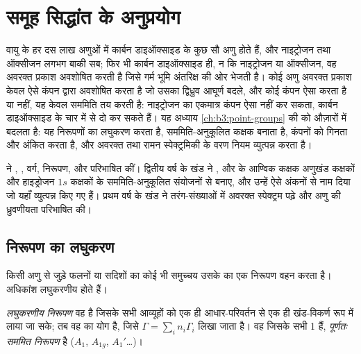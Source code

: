 \chapter{समूह सिद्धांत के अनुप्रयोग}\label{ch:b3:group-theory-applied}

वायु के हर दस लाख अणुओं में कार्बन डाइऑक्साइड के कुछ सौ अणु होते हैं, और
नाइट्रोजन तथा ऑक्सीजन लगभग बाकी सब; फिर भी कार्बन डाइऑक्साइड ही, न कि
नाइट्रोजन या ऑक्सीजन, वह अवरक्त प्रकाश अवशोषित करती है जिसे गर्म भूमि
अंतरिक्ष की ओर भेजती है। कोई अणु अवरक्त प्रकाश केवल ऐसे कंपन द्वारा अवशोषित करता है जो
उसका द्विध्रुव आघूर्ण बदले, और कोई कंपन ऐसा करता है या नहीं, यह केवल
सममिति तय करती है: नाइट्रोजन का एकमात्र कंपन ऐसा नहीं कर सकता, कार्बन डाइऑक्साइड के
चार में से दो कर सकते हैं। यह अध्याय
\cref{ch:b3:point-groups} की  को औज़ारों में बदलता है: यह निरूपणों का
लघुकरण करता है, सममिति-अनुकूलित कक्षक बनाता है, कंपनों को गिनता और अंकित करता है,
और अवरक्त तथा रामन स्पेक्ट्रमिकी के वरण नियम व्युत्पन्न करता है।

\begin{recall}
 ने , ,
वर्ग, निरूपण,  और  परिभाषित कीं। द्वितीय वर्ष के
खंड ने ,  और  के आण्विक कक्षक
अणुखंड कक्षकों और हाइड्रोजन $1s$
कक्षकों के सममिति-अनुकूलित संयोजनों से बनाए, और उन्हें ऐसे अंकनों से नाम दिया जो यहाँ व्युत्पन्न
किए गए हैं। प्रथम वर्ष के खंड ने तरंग-संख्याओं में अवरक्त स्पेक्ट्रम पढ़े और अणु की
ध्रुवणीयता परिभाषित की।
\end{recall}

\section{निरूपण का लघुकरण}

किसी अणु से जुड़े फलनों या सदिशों का कोई भी समुच्चय उसके  का एक
निरूपण वहन करता है। अधिकांश लघुकरणीय होते हैं।

\begin{definition}\label{def:b3:group-theory-applied:reducible}
\emph{लघुकरणीय निरूपण} वह है
जिसके सभी आव्यूहों को एक ही आधार-परिवर्तन से एक ही
खंड-विकर्ण रूप में लाया जा सके; तब वह  का योग है,
जिसे $\Gamma = \sum_in_i\Gamma_i$ लिखा जाता है। वह  जिसके
सभी  1 हैं, \emph{पूर्णतः सममित
निरूपण} है ($A_1$, $A_{1g}$,
$A_1'$\dots)।
\end{definition}


